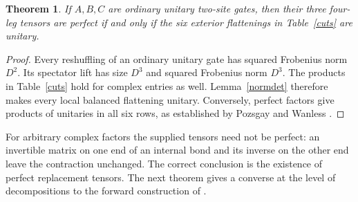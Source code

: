 \documentclass[11pt]{article}
\newtheorem{theorem}{Theorem}
\begin{document}
\begin{theorem}\label{quantum}
If $A,B,C$ are ordinary unitary two-site gates, then their three
four-leg tensors are perfect if and only if the six exterior flattenings
in Table~\ref{cuts} are unitary.
\end{theorem}
\begin{proof}
Every reshuffling of an ordinary unitary gate has squared Frobenius norm
$D^2$. Its spectator lift has size $D^3$ and squared Frobenius norm
$D^3$. The products in Table~\ref{cuts} hold for complex entries as well.
Lemma~\ref{normdet} therefore makes every local balanced flattening
unitary. Conversely, perfect factors give products of unitaries in all
six rows, as established by Pozsgay and Wanless
\cite[\S3.2, Theorems 1--2]{PW}.
\end{proof}

For arbitrary complex factors the supplied tensors need not be perfect:
an invertible matrix on one end of an internal bond and its inverse on
the other end leave the contraction unchanged. The correct conclusion
is the existence of perfect replacement tensors. The next theorem gives
a converse at the level of decompositions to the forward construction
of \cite[\S3.2, Theorems 1--2]{PW}.
\end{document}
